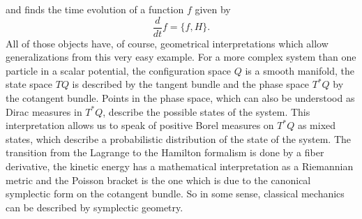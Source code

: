 and finds the time evolution of a function $f$ given by
\begin{equation*}
	\frac{d}{dt} f
	=
	\{ f, H \}.
\end{equation*}
All of those objects have, of course, geometrical interpretations which 
allow generalizations from this very easy example. For a more 
complex system than one particle in a scalar potential, the configuration space 
$Q$ is a smooth manifold, the state space $TQ$ is described by the tangent 
bundle and the phase space $T^*Q$ by the cotangent bundle. Points in the phase 
space, which can also be understood as Dirac measures in $T^*Q$, describe the 
possible states of the system. This interpretation allows us to speak of positive 
Borel measures on $T^*Q$ as mixed states, which describe a probabilistic 
distribution of the state of the system. The transition from 
the Lagrange to the Hamilton formalism is done by a fiber derivative, the 
kinetic energy has a mathematical interpretation as a Riemannian metric and the 
Poisson bracket is the one which is due to the canonical symplectic form on the 
cotangent bundle. So in some sense, classical mechanics can be described by 
symplectic geometry.


